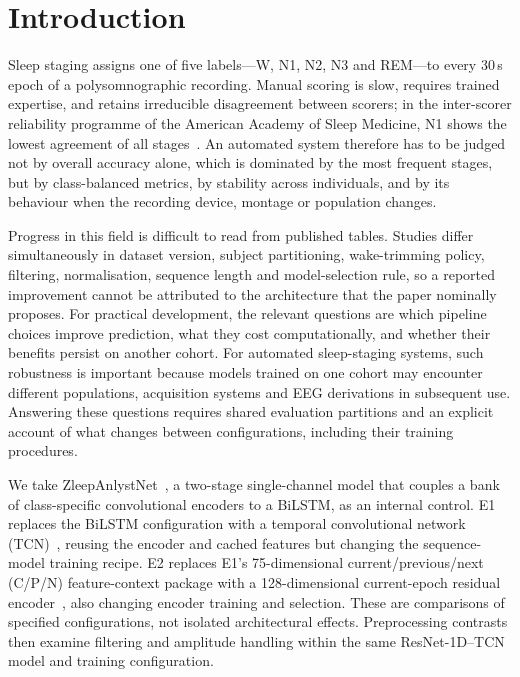 \documentclass[11pt,a4paper]{article}
\begin{document}
\section{Introduction}

Sleep staging assigns one of five labels---W, N1, N2, N3 and REM---to every 30\,s epoch of a
polysomnographic recording. Manual scoring is slow, requires trained expertise, and retains
irreducible disagreement between scorers; in the inter-scorer reliability programme of the American
Academy of Sleep Medicine, N1 shows the lowest agreement of all stages~\cite{rosenberg2013aasm}. An
automated system therefore has to be judged not by overall accuracy alone, which is dominated by the
most frequent stages, but by class-balanced metrics, by stability across individuals, and by its
behaviour when the recording device, montage or population changes.

Progress in this field is difficult to read from published tables. Studies differ simultaneously in
dataset version, subject partitioning, wake-trimming policy, filtering, normalisation, sequence length
and model-selection rule, so a reported improvement cannot be attributed to the architecture that the
paper nominally proposes. For practical development, the relevant questions are which pipeline choices
improve prediction, what they cost computationally, and whether their benefits persist on another cohort.
For automated sleep-staging systems, such robustness is important because models trained on one cohort
may encounter different populations, acquisition systems and EEG derivations in subsequent use.
Answering these questions requires shared evaluation partitions and an explicit account of what changes
between configurations, including their training procedures.

We take ZleepAnlystNet~\cite{jadhav2024zleepanlystnet}, a two-stage single-channel model that couples a
bank of class-specific convolutional encoders to a BiLSTM, as an internal control. E1 replaces the
BiLSTM configuration with a temporal convolutional network (TCN)~\cite{bai2018tcn}, reusing the encoder
and cached features but changing the sequence-model training recipe. E2 replaces E1's 75-dimensional
current/previous/next (C/P/N) feature-context package with a 128-dimensional current-epoch residual
encoder~\cite{he2016resnet}, also changing encoder training and selection. These are comparisons of
specified configurations, not isolated architectural effects. Preprocessing contrasts then examine
filtering and amplitude handling within the same ResNet-1D--TCN model and training configuration.
\end{document}

